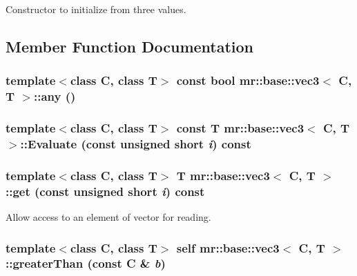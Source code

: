 Constructor to initialize from three values. 



\subsection{Member Function Documentation}
\subsubsection{\setlength{\rightskip}{0pt plus 5cm}template$<$class C, class T$>$ const bool {\bf mr::base::vec3}$<$ C, T $>$::any ()\hspace{0.3cm}{\tt  [inline]}}\label{structmr_1_1base_1_1vec3_z42_4}


\subsubsection{\setlength{\rightskip}{0pt plus 5cm}template$<$class C, class T$>$ const T {\bf mr::base::vec3}$<$ C, T $>$::Evaluate (const unsigned short {\em i}) const\hspace{0.3cm}{\tt  [inline]}}\label{structmr_1_1base_1_1vec3_a0}


\subsubsection{\setlength{\rightskip}{0pt plus 5cm}template$<$class C, class T$>$ T {\bf mr::base::vec3}$<$ C, T $>$::get (const unsigned short {\em i}) const\hspace{0.3cm}{\tt  [inline]}}\label{structmr_1_1base_1_1vec3_z35_4}


Allow access to an element of vector for reading. 

\subsubsection{\setlength{\rightskip}{0pt plus 5cm}template$<$class C, class T$>$ {\bf self} {\bf mr::base::vec3}$<$ C, T $>$::greater\-Than (const C \& {\em b})\hspace{0.3cm}{\tt  [inline]}}\label{structmr_1_1base_1_1vec3_z42_2}


